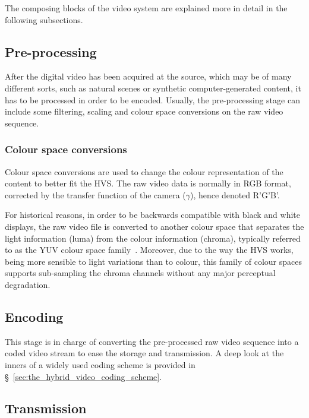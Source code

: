 \documentclass[11pt,a4paper,openright,twoside]{book}
\numberwithin{equation}{section} %
\begin{document}
The composing blocks of the video system are explained more in detail in
the following subsections.

\subsection{Pre-processing}
\label{sub:pre_processing}

After the digital video has been acquired at the source, which may be of
many different sorts, such as natural scenes or synthetic
computer-generated content, it has to be processed in order to be
encoded.
Usually, the pre-processing stage can include some filtering, scaling
and colour space conversions on the raw video sequence.

\subsubsection{Colour space conversions}
\label{ssub:colour_space_conversions}

Colour space conversions are used to change the colour
representation of the content to better fit the \ac{HVS}.
The raw video data is normally in \ac{RGB} format, corrected by the
transfer function of the camera ($\gamma$), hence denoted R'G'B'.

For historical reasons, in order to be backwards compatible with black
and white displays, the raw video file is converted to another colour
space that separates the light information (luma) from the colour
information (chroma), typically referred to as the YUV colour space
family~\cite{poynton-95-color-space}.
Moreover, due to the way the \ac{HVS} works, being more sensible to
light variations than to colour, this family of colour spaces supports
sub-sampling the chroma channels without any major perceptual
degradation.

\subsection{Encoding}
\label{sub:encoding}

This stage is in charge of converting the pre-processed raw video sequence
into a coded video stream to ease the storage and transmission.
A deep look at the inners of a widely used coding scheme is provided
in \S~\ref{sec:the_hybrid_video_coding_scheme}.

\subsection{Transmission}
\label{sub:transmission}
\end{document}
